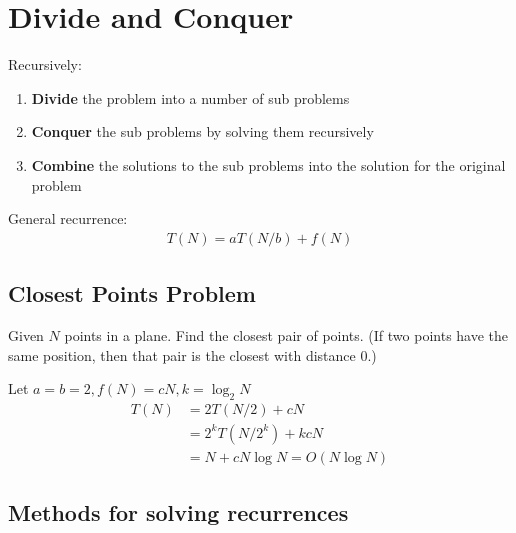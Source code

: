 \newpage

\section{Divide and Conquer}
Recursively:
\begin{enumerate}
    \item \textbf{Divide} the problem into a number of sub problems
    \item \textbf{Conquer} the sub problems by solving them recursively
    \item \textbf{Combine} the solutions to the sub problems into the solution for the original problem
\end{enumerate}
General recurrence: 
\begin{align*}
    T(N)=aT(N/b)+f(N)
\end{align*}

\subsection{Closest Points Problem}
Given $N$ points in a plane.  Find the closest pair of points.  (If two points have the same position, then that pair is the closest with distance 0.)


Let $a=b=2, f(N)=cN, k=\log_2 N$
\begin{align*}
    T(N)&=2T(N/2)+cN\\
    &=2^kT(N/2^k)+kcN\\
    &=N+cN\log N=O(N\log N)
\end{align*}




\subsection{Methods for solving recurrences}

